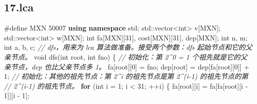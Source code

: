 \documentclass[
]{article}
\newenvironment{Shaded}{}{}
\newcommand{\BuiltInTok}[1]{\textcolor[rgb]{0.00,0.50,0.00}{#1}}
\newcommand{\CommentTok}[1]{\textcolor[rgb]{0.38,0.63,0.69}{\textit{#1}}}
\newcommand{\ControlFlowTok}[1]{\textcolor[rgb]{0.00,0.44,0.13}{\textbf{#1}}}
\newcommand{\DataTypeTok}[1]{\textcolor[rgb]{0.56,0.13,0.00}{#1}}
\newcommand{\DecValTok}[1]{\textcolor[rgb]{0.25,0.63,0.44}{#1}}
\newcommand{\KeywordTok}[1]{\textcolor[rgb]{0.00,0.44,0.13}{\textbf{#1}}}
\newcommand{\NormalTok}[1]{#1}
\newcommand{\OperatorTok}[1]{\textcolor[rgb]{0.40,0.40,0.40}{#1}}
\newcommand{\PreprocessorTok}[1]{\textcolor[rgb]{0.74,0.48,0.00}{#1}}
\begin{document}
\hypertarget{17lca}{%
\subsection{17.lca}\label{17lca}}

\begin{Shaded}
\begin{Highlighting}[]
\PreprocessorTok{\#define MXN }\DecValTok{50007}
\KeywordTok{using} \KeywordTok{namespace}\NormalTok{ std}\OperatorTok{;}
\BuiltInTok{std::}\NormalTok{vector}\OperatorTok{\textless{}}\DataTypeTok{int}\OperatorTok{\textgreater{}}\NormalTok{ v}\OperatorTok{[}\NormalTok{MXN}\OperatorTok{];}
\BuiltInTok{std::}\NormalTok{vector}\OperatorTok{\textless{}}\DataTypeTok{int}\OperatorTok{\textgreater{}}\NormalTok{ w}\OperatorTok{[}\NormalTok{MXN}\OperatorTok{];}
\DataTypeTok{int}\NormalTok{ fa}\OperatorTok{[}\NormalTok{MXN}\OperatorTok{][}\DecValTok{31}\OperatorTok{],}\NormalTok{ cost}\OperatorTok{[}\NormalTok{MXN}\OperatorTok{][}\DecValTok{31}\OperatorTok{],}\NormalTok{ dep}\OperatorTok{[}\NormalTok{MXN}\OperatorTok{];}
\DataTypeTok{int}\NormalTok{ n}\OperatorTok{,}\NormalTok{ m}\OperatorTok{;}
\DataTypeTok{int}\NormalTok{ a}\OperatorTok{,}\NormalTok{ b}\OperatorTok{,}\NormalTok{ c}\OperatorTok{;}
\CommentTok{// dfs，用来为 lca 算法做准备。接受两个参数：dfs 起始节点和它的父亲节点。}
\DataTypeTok{void}\NormalTok{ dfs}\OperatorTok{(}\DataTypeTok{int}\NormalTok{ root}\OperatorTok{,} \DataTypeTok{int}\NormalTok{ fno}\OperatorTok{)} \OperatorTok{\{}
  \CommentTok{// 初始化：第 2\^{}0 = 1 个祖先就是它的父亲节点，dep 也比父亲节点多 1。}
\NormalTok{  fa}\OperatorTok{[}\NormalTok{root}\OperatorTok{][}\DecValTok{0}\OperatorTok{]} \OperatorTok{=}\NormalTok{ fno}\OperatorTok{;}
\NormalTok{  dep}\OperatorTok{[}\NormalTok{root}\OperatorTok{]} \OperatorTok{=}\NormalTok{ dep}\OperatorTok{[}\NormalTok{fa}\OperatorTok{[}\NormalTok{root}\OperatorTok{][}\DecValTok{0}\OperatorTok{]]} \OperatorTok{+} \DecValTok{1}\OperatorTok{;}
  \CommentTok{// 初始化：其他的祖先节点：第 2\^{}i 的祖先节点是第 2\^{}(i{-}1) 的祖先节点的第}
  \CommentTok{// 2\^{}(i{-}1) 的祖先节点。}
  \ControlFlowTok{for} \OperatorTok{(}\DataTypeTok{int}\NormalTok{ i }\OperatorTok{=} \DecValTok{1}\OperatorTok{;}\NormalTok{ i }\OperatorTok{\textless{}} \DecValTok{31}\OperatorTok{;} \OperatorTok{++}\NormalTok{i}\OperatorTok{)} \OperatorTok{\{}
\NormalTok{    fa}\OperatorTok{[}\NormalTok{root}\OperatorTok{][}\NormalTok{i}\OperatorTok{]} \OperatorTok{=}\NormalTok{ fa}\OperatorTok{[}\NormalTok{fa}\OperatorTok{[}\NormalTok{root}\OperatorTok{][}\NormalTok{i }\OperatorTok{{-}} \DecValTok{1}\OperatorTok{]][}\NormalTok{i }\OperatorTok{{-}} \DecValTok{1}\OperatorTok{];}

\end{Highlighting}
\end{Shaded}
\end{document}
